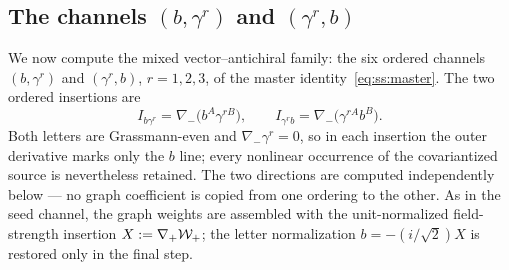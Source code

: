 \subsection{The channels $(b,\gamma^{r})$ and $(\gamma^{r},b)$}%
\label{sec:superspace:bgamma}

We now compute the mixed vector--antichiral family: the six ordered channels $(b,\gamma^{r})$ and $(\gamma^{r},b)$,
$r=1,2,3$, of the master identity~\eqref{eq:ss:master}. The two ordered insertions are
\begin{equation}\label{eq:bg:insert}
I_{b\gamma^{r}}=\nabla_{-}\big(b^{A}\gamma^{rB}\big), \qquad I_{\gamma^{r}b}=\nabla_{-}\big(\gamma^{rA}b^{B}\big) .
\end{equation}
Both letters are Grassmann-even and $\nabla_{-}\gamma^{r}=0$, so in each insertion the outer derivative marks only
the $b$ line; every nonlinear occurrence of the covariantized source is nevertheless retained. The two directions
are computed independently below --- no graph coefficient is copied from one ordering to the other. As in the seed
channel, the graph weights are assembled with the unit-normalized field-strength insertion $X:=\nabla_{+}\mathcal{W}_{+}$;
the letter normalization $b=-(i/\sqrt2)X$ is restored only in the final step.

